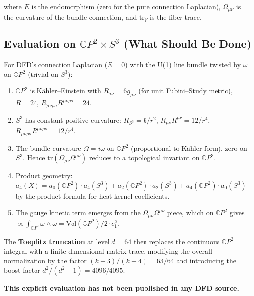 \documentclass[11pt,a4paper]{article}
\begin{document}
where $E$ is the endomorphism (zero for the pure connection Laplacian),
$\Omega_{\mu\nu}$ is the curvature of the bundle connection, and $\mathrm{tr}_V$
is the fiber trace.

\subsection{Evaluation on $\mathbb{C}P^2 \times S^3$ (What Should Be Done)}

For DFD's connection Laplacian ($E = 0$) with the U(1) line bundle twisted by
$\omega$ on $\mathbb{C}P^2$ (trivial on $S^3$):

\begin{enumerate}
\item $\mathbb{C}P^2$ is K\"ahler--Einstein with $R_{\mu\nu} = 6g_{\mu\nu}$
(for unit Fubini--Study metric), $R = 24$,
$R_{\mu\nu\rho\sigma}R^{\mu\nu\rho\sigma} = 24$.

\item $S^3$ has constant positive curvature: $R_{S^3} = 6/r^2$,
$R_{\mu\nu}R^{\mu\nu} = 12/r^4$,
$R_{\mu\nu\rho\sigma}R^{\mu\nu\rho\sigma} = 12/r^4$.

\item The bundle curvature $\Omega = i\omega$ on $\mathbb{C}P^2$ (proportional
to K\"ahler form), zero on $S^3$.  Hence
$\mathrm{tr}(\Omega_{\mu\nu}\Omega^{\mu\nu})$ reduces to a topological
invariant on $\mathbb{C}P^2$.

\item Product geometry: $a_4(X) = a_0(\mathbb{C}P^2) \cdot a_4(S^3)
+ a_2(\mathbb{C}P^2) \cdot a_2(S^3) + a_4(\mathbb{C}P^2) \cdot a_0(S^3)$
by the product formula for heat-kernel coefficients.

\item The gauge kinetic term emerges from the $\Omega_{\mu\nu}\Omega^{\mu\nu}$
piece, which on $\mathbb{C}P^2$ gives $\propto \int_{\mathbb{C}P^2} \omega \wedge \omega
= \mathrm{Vol}(\mathbb{C}P^2)/2 \cdot c_1^2$.
\end{enumerate}

The \textbf{Toeplitz truncation} at level $d = 64$ then replaces the
continuous $\mathbb{C}P^2$ integral with a finite-dimensional matrix trace,
modifying the overall normalization by the factor $(k+3)/(k+4) = 63/64$ and
introducing the boost factor $d^2/(d^2-1) = 4096/4095$.

\textbf{This explicit evaluation has not been published in any DFD source.}

\end{document}
